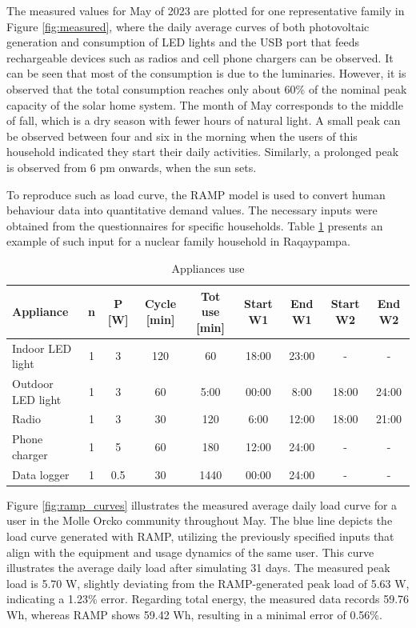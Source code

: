 \documentclass[final,3p,times,onecolumn]{elsarticle}
\begin{document}
The measured values for May of 2023 are plotted for one representative family in Figure \ref{fig:measured}, where the daily average curves of both photovoltaic generation and consumption of LED lights and the USB port that feeds rechargeable devices such as radios and cell phone chargers can be observed. It can be seen that most of the consumption is due to the luminaries. However, it is observed that the total consumption reaches only about 60\% of the nominal peak capacity of the solar home system. The month of May corresponds to the middle of fall, which is a dry season with fewer hours of natural light. A small peak can be observed between four and six in the morning when the users of this household indicated they start their daily activities. Similarly, a prolonged peak is observed from 6 pm onwards, when the sun sets.

To reproduce such as load curve, the RAMP model is used to convert human behaviour data into quantitative demand values. The necessary inputs were obtained from the questionnaires for specific households. Table \ref{tab:app_use} presents an example of such input for a nuclear family household in Raqaypampa. 
\begin{table}
    \centering
    \begin{tabular}{lcccccccc}
        Appliance & n & P [W] & Cycle [min] & Tot use [min] & Start W1 & End W1 & Start W2 & End W2\\\hline
      Indoor LED light  & 1 & 3 & 120 & 60 & 18:00 & 23:00 & - & -\\
      Outdoor LED light   & 1 & 3 & 60 & 5:00 & 00:00 & 8:00 & 18:00 & 24:00\\
      Radio  & 1 & 3 & 30 & 120 & 6:00 & 12:00 & 18:00 & 21:00\\
      Phone charger   & 1 & 5 & 60 & 180 & 12:00 & 24:00 & - & -\\
      Data logger   & 1 & 0.5 & 30 & 1440 & 00:00 & 24:00 & - & - \\\hline
    \end{tabular}
    \caption{Appliances use}
    \label{tab:app_use}
\end{table}

Figure \ref{fig:ramp_curves} illustrates the measured average daily load curve for a user in the Molle Orcko community throughout May. The blue line depicts the load curve generated with RAMP, utilizing the previously specified inputs that align with the equipment and usage dynamics of the same user. This curve illustrates the average daily load after simulating 31 days. The measured peak load is 5.70 W, slightly deviating from the RAMP-generated peak load of 5.63 W, indicating a 1.23\% error. Regarding total energy, the measured data records 59.76 Wh, whereas RAMP shows 59.42 Wh, resulting in a minimal error of 0.56\%. 
\end{document}
